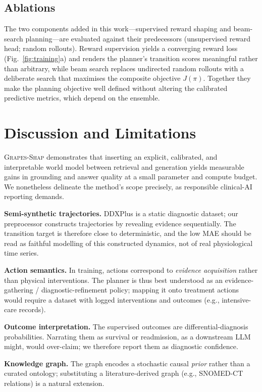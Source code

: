 \documentclass[conference]{IEEEtran}
\newcommand{\method}{\textsc{Grapes-Shap}}
\begin{document}
\subsection{Ablations}
The two components added in this work---supervised reward shaping and
beam-search planning---are evaluated against their predecessors (unsupervised
reward head; random rollouts). Reward supervision yields a converging reward
loss (Fig.~\ref{fig:training}a) and renders the planner's transition scores
meaningful rather than arbitrary, while beam search replaces undirected random
rollouts with a deliberate search that maximises the composite objective
$J(\pi)$. Together they make the planning objective well defined without
altering the calibrated predictive metrics, which depend on the ensemble.

\section{Discussion and Limitations}
\label{sec:limits}
\method{} demonstrates that inserting an explicit, calibrated, and
interpretable world model between retrieval and generation yields measurable
gains in grounding and answer quality at a small parameter and compute budget.
We nonetheless delineate the method's scope precisely, as responsible
clinical-AI reporting demands.

\textbf{Semi-synthetic trajectories.} DDXPlus is a static diagnostic dataset;
our preprocessor constructs trajectories by revealing evidence sequentially.
The transition target is therefore close to deterministic, and the low MAE
should be read as faithful modelling of this constructed dynamics, not of real
physiological time series.

\textbf{Action semantics.} In training, actions correspond to
\emph{evidence acquisition} rather than physical interventions. The planner is
thus best understood as an evidence-gathering / diagnostic-refinement policy;
mapping it onto treatment actions would require a dataset with logged
interventions and outcomes (e.g., intensive-care records).

\textbf{Outcome interpretation.} The supervised outcomes are
differential-diagnosis probabilities. Narrating them as survival or
readmission, as a downstream LLM might, would over-claim; we therefore report
them as diagnostic confidence.

\textbf{Knowledge graph.} The graph encodes a stochastic causal \emph{prior}
rather than a curated ontology; substituting a literature-derived graph (e.g.,
SNOMED-CT relations) is a natural extension.
\end{document}
